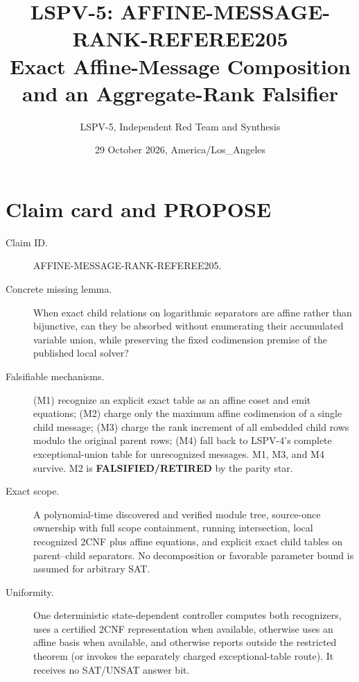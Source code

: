 \documentclass[11pt]{article}
\title{LSPV-5: AFFINE-MESSAGE-RANK-REFEREE205\\[2pt]
\large Exact Affine-Message Composition and an Aggregate-Rank Falsifier}
\author{LSPV-5, Independent Red Team and Synthesis}
\date{29 October 2026, America/Los\_Angeles}
\begin{document}
\maketitle

\begin{center}
\end{center}

\section{Claim card and PROPOSE}
\begin{description}
\item[Claim ID.] AFFINE-MESSAGE-RANK-REFEREE205.
\item[Concrete missing lemma.] When exact child relations on logarithmic
separators are affine rather than bijunctive, can they be absorbed without
enumerating their accumulated variable union, while preserving the fixed
codimension premise of the published local solver?
\item[Falsifiable mechanisms.] (M1) recognize an explicit exact table as an
affine coset and emit equations; (M2) charge only the maximum affine
codimension of a single child message; (M3) charge the rank increment of all
embedded child rows modulo the original parent rows; (M4) fall back to
LSPV-4's complete exceptional-union table for unrecognized messages.
M1, M3, and M4 survive.  M2 is \textbf{FALSIFIED/RETIRED} by the parity star.
\item[Exact scope.] A polynomial-time discovered and verified module tree,
source-once ownership with full scope containment, running intersection,
local recognized 2CNF plus affine equations, and explicit exact child tables
on parent--child separators.  No decomposition or favorable parameter bound
is assumed for arbitrary SAT.
\item[Uniformity.] One deterministic state-dependent controller computes both
recognizers, uses a certified 2CNF representation when available, otherwise
uses an affine basis when available, and otherwise reports outside the
restricted theorem (or invokes the separately charged exceptional-table
route).  It receives no SAT/UNSAT answer bit.
\end{description}
\end{document}
